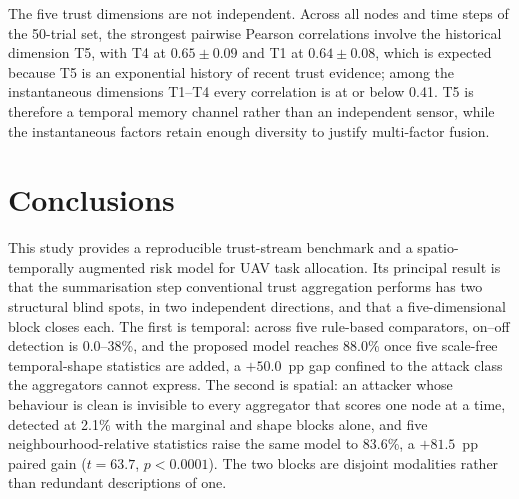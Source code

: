 \documentclass[notspecified,article,submit,moreauthors]{Definitions/mdpi}
\begin{document}
The five trust dimensions are not independent. Across all nodes and time steps of the 50-trial set, the strongest pairwise Pearson correlations involve the historical dimension T5, with T4 at $0.65 \pm 0.09$ and T1 at $0.64 \pm 0.08$, which is expected because T5 is an exponential history of recent trust evidence; among the instantaneous dimensions T1--T4 every correlation is at or below 0.41. T5 is therefore a temporal memory channel rather than an independent sensor, while the instantaneous factors retain enough diversity to justify multi-factor fusion.

\section{Conclusions}
\label{sec:conclusions}

This study provides a reproducible trust-stream benchmark and a spatio-temporally augmented risk model for UAV task allocation. Its principal result is that the summarisation step conventional trust aggregation performs has two structural blind spots, in two independent directions, and that a five-dimensional block closes each. The first is temporal: across five rule-based comparators, on--off detection is 0.0--38\%, and the proposed model reaches 88.0\% once five scale-free temporal-shape statistics are added, a $+50.0$~pp gap confined to the attack class the aggregators cannot express. The second is spatial: an attacker whose behaviour is clean is invisible to every aggregator that scores one node at a time, detected at 2.1\% with the marginal and shape blocks alone, and five neighbourhood-relative statistics raise the same model to 83.6\%, a $+81.5$~pp paired gain ($t=63.7$, $p<0.0001$). The two blocks are disjoint modalities rather than redundant descriptions of one.
\end{document}

